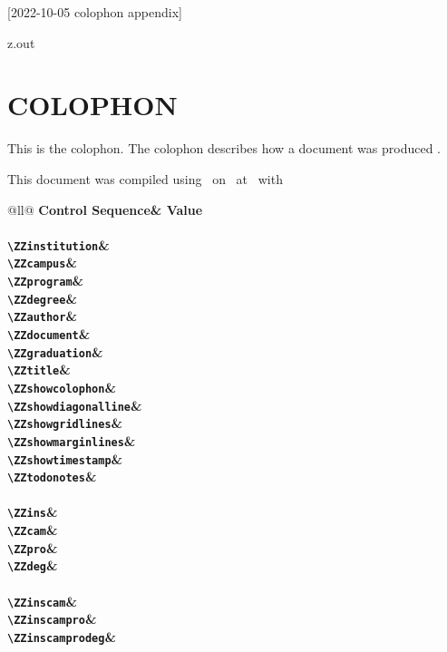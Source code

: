 [2022-10-05 colophon appendix]

\begin{VerbatimOut}{z.out}
\chapter*{COLOPHON}
\label{ap:colophon}


This is the colophon.
The colophon describes how a document was produced
\cite{diggypod-colophon}.

This document was compiled using \PurdueThesisVersion\ on \ZZDateRun\ at \ZZTimeRun\ with\\
\begin{tabular}{@{}ll@{}}
  \noalign{\vspace*{6pt}}
  \toprule
  \bf Control Sequence& \bf Value\\
  \midrule
  \\
  \verb+\ZZinstitution+& \ZZinstitution\\
  \verb+\ZZcampus+& \ZZcampus\\
  \verb+\ZZprogram+& \ZZprogram\\
  \verb+\ZZdegree+& \ZZdegree\\
  \verb+\ZZauthor+& \ZZauthor\\
  \verb+\ZZdocument+& \ZZdocument\\
  \verb+\ZZgraduation+& \ZZgraduation\\
  \verb+\ZZtitle+& \ZZtitle\\
  \noalign{\vspace*{6pt}}
  \verb+\ZZshowcolophon+& \ZZshowcolophon\\
  \verb+\ZZshowdiagonalline+& \ZZshowdiagonalline\\
  \verb+\ZZshowgridlines+& \ZZshowgridlines\\
  \verb+\ZZshowmarginlines+& \ZZshowmarginlines\\
  \verb+\ZZshowtimestamp+& \ZZshowtimestamp\\
  \verb+\ZZtodonotes+& \ZZtodonotes\\
  \noalign{\vspace*{12pt}}
  \\
  \verb+\ZZins+& \ZZins\\
  \verb+\ZZcam+& \ZZcam\\
  \verb+\ZZpro+& \ZZpro\\
  \verb+\ZZdeg+& \ZZdeg\\
  \noalign{\vspace*{12pt}}
  \\
  \verb+\ZZinscam+& \ZZinscam\\
  \verb+\ZZinscampro+& \ZZinscampro\\
  \verb+\ZZinscamprodeg+& \ZZinscamprodeg\\
  \noalign{\vspace*{12pt}}
  \\
  \bottomrule
\end{tabular}
\end{VerbatimOut}

\MyIO
